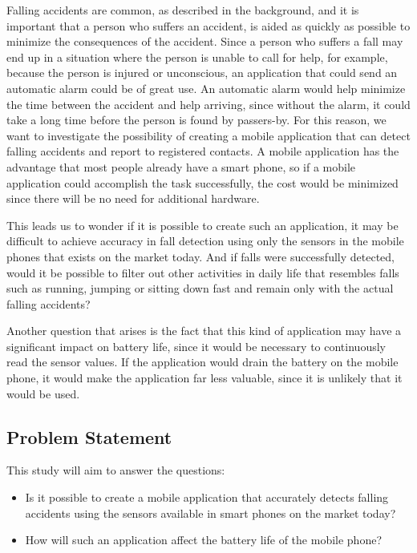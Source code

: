 \documentclass[12pt, a4paper, onecolumn]{article}
\begin{document}
		Falling accidents are common, as described in the background, and it is important that a person who suffers an accident, is aided as quickly as possible to minimize the consequences of the accident. Since a person who suffers a fall may end up in a situation where the person is unable to call for help, for example, because the person is injured or unconscious, an application that could send an automatic alarm could be of great use. An automatic alarm would help minimize the time between the accident and help arriving, since without the alarm, it could take a long time before the person is found by passers-by. For this reason, we want to investigate the possibility of creating a mobile application that can detect falling accidents and report to registered contacts. A mobile application has the advantage that most people already have a smart phone, so if a mobile application could accomplish the task successfully, the cost would be minimized since there will be no need for additional hardware.
		
		This leads us to wonder if it is possible to create such an application, it may be difficult to achieve accuracy in fall detection using only the sensors in the mobile phones that exists on the market today. And if falls were successfully detected, would it be possible to filter out other activities in daily life that resembles falls such as running, jumping or sitting down fast and remain only with the actual falling accidents?
		
		Another question that arises is the fact that this kind of application may have a significant impact on battery life, since it would be necessary to continuously read the sensor values. If the application would drain the battery on the mobile phone, it would make the application far less valuable, since it is unlikely that it would be used.
		
		\subsection{Problem Statement}
		
		This study will aim to answer the questions:
		
		\begin{itemize}
			\item Is it possible to create a mobile application that accurately detects falling accidents using the sensors available in smart phones on the market today?
			\item How will such an application affect the battery life of the mobile phone?
		\end{itemize}
		
\end{document}

